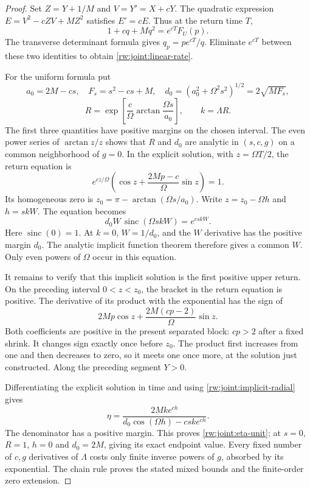 \begin{proof}
Set $Z=Y+1/M$ and $V=Y'=X+cY$. The quadratic expression
$E=V^2-cZV+MZ^2$ satisfies $E'=cE$. Thus at the return time $T$,
\[
 1+cq+Mq^2=e^{cT}F_U(p).
\]
The transverse determinant formula gives $q_p=pe^{cT}/q$.
Eliminate $e^{cT}$ between these two identities to obtain
\eqref{rw:joint:linear-rate}.

For the uniform formula put
\[
 a_0=2M-cs,\quad F_s=s^2-cs+M,\quad
 d_0=(a_0^2+\Omega^2s^2)^{1/2}=2\sqrt{MF_s},
\]
\[
 R=\exp\left[\frac c\Omega
                    \arctan\frac{\Omega s}{a_0}\right],
 \qquad k=\Lambda R.
\]
The first three quantities have positive margins on the chosen
interval. The even power series of $\arctan z/z$ shows that $R$
and $d_0$ are analytic in $(s,c,g)$ on a common neighborhood of
$g=0$. In the explicit solution, with $z=\Omega T/2$, the return
equation is
\[
 e^{cz/\Omega}
       \left(\cos z+\frac{2Mp-c}{\Omega}\sin z\right)=1.
\]
Its homogeneous zero is
$z_0=\pi-\arctan(\Omega s/a_0)$. Write
$z=z_0-\Omega h$ and $h=skW$. The equation becomes
\begin{equation}\label{rw:joint:implicit-radial}
 d_0W\,\operatorname{sinc}(\Omega skW)=e^{cskW}.
\end{equation}
Here $\operatorname{sinc}(0)=1$. At $k=0$, $W=1/d_0$, and
the $W$ derivative has the positive margin $d_0$. The analytic
implicit function theorem therefore gives a common $W$.
Only even powers of $\Omega$ occur in this equation.

It remains to verify that this implicit solution is the first
positive upper return. On the preceding interval $0<z<z_0$, the
bracket in the return equation is positive.
The derivative of its product with the exponential has the sign of
\[
 2Mp\cos z+\frac{2M(cp-2)}{\Omega}\sin z.
\]
Both coefficients are positive in the present separated block:
$cp>2$ after a fixed shrink. It changes sign exactly once before
$z_0$. The product first increases from one and then decreases to
zero, so it meets one once more, at the solution just constructed.
Along the preceding segment $Y>0$.

Differentiating the explicit solution in time and using
\eqref{rw:joint:implicit-radial} gives
\[
 \eta=\frac{2Mk e^{ch}}
                  {d_0\cos(\Omega h)-csk e^{ch}}.
\]
The denominator has a positive margin. This proves
\eqref{rw:joint:eta-unit}; at $s=0$, $R=1$, $h=0$ and
$d_0=2M$, giving its exact endpoint value. Every fixed number of
$c,g$ derivatives of $\Lambda$ costs only finite inverse powers of
$g$, absorbed by its exponential. The chain rule proves the stated
mixed bounds and the finite-order zero extension.
\end{proof}


